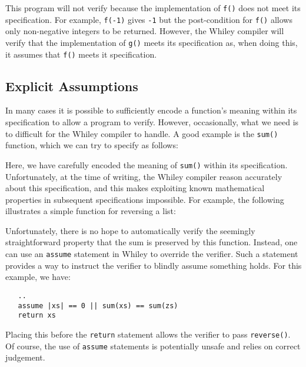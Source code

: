 

This program will not verify because the implementation of
\lstinline{f()} does not meet its specification.  For example,
\lstinline{f(-1)} gives \lstinline{-1} but the post-condition for
\lstinline{f()} allows only non-negative integers to be returned.
However, the Whiley compiler will verify that the implementation of
\lstinline{g()} meets its specification as, when doing this, it
assumes that \lstinline{f()} meets it specification.

\subsection{Explicit Assumptions}

In many cases it is possible to sufficiently encode a function's meaning within its specification to allow a program to verify.  However, occasionally, what we need is to difficult for the Whiley compiler to handle.  A good example is the \lstinline{sum()} function, which we can try to specify as follows:



Here, we have carefully encoded the meaning of \lstinline{sum()} within its specification.  Unfortunately, at the time of writing, the Whiley compiler reason accurately about this specification, and this makes exploiting known mathematical properties in subsequent specifications impossible.  For example, the following illustrates a simple function for reversing a list:



Unfortunately, there is no hope to automatically verify the seemingly straightforward property that the sum is preserved by this function.  Instead, one can use an \lstinline{assume} statement in Whiley to override the verifier.  Such a statement provides a way to instruct the verifier to blindly assume something holds.  For this example, we have:
\begin{lstlisting}
   ..
   assume |xs| == 0 || sum(xs) == sum(zs)
   return xs
\end{lstlisting}

Placing this before the \lstinline{return} statement allows the verifier to pass \lstinline{reverse()}.  Of course, the use of \lstinline{assume} statements is potentially unsafe and relies on correct judgement.  
